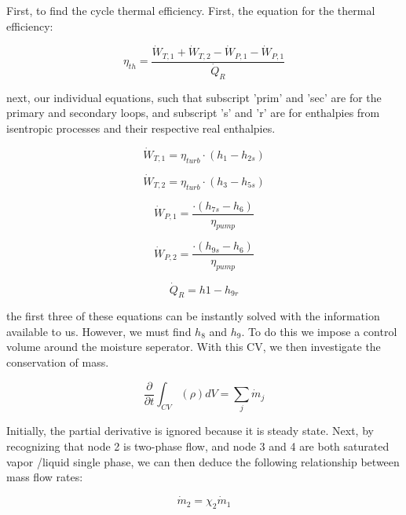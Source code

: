 \documentclass{article}
\begin{document}
First, to find the cycle thermal efficiency. First, the equation for the thermal efficiency:

\begin{equation}
    \eta_{th} = \frac{\Dot{W}_{T,1} + \Dot{W}_{T,2} - \Dot{W}_{P,1} - \Dot{W}_{P,1}}{\Dot{Q}_R}
\end{equation}

next, our individual equations, such that subscript 'prim' and 'sec' are for the primary and secondary loops, and subscript 's' and 'r' are for enthalpies from isentropic processes and their respective real enthalpies. 

\begin{equation}
    \Dot{W}_{T,1} = \eta_{turb} \cdot (h_1 - h_{2s}) 
\end{equation}

\begin{equation}
    \Dot{W}_{T,2} = \eta_{turb} \cdot (h_3 - h_{5s}) 
\end{equation}

\begin{equation}
    \Dot{W}_{P,1} = \frac{\cdot (h_{7s} - h_{6})}{\eta_{pump}} 
\end{equation}

\begin{equation}
    \Dot{W}_{P,2} = \frac{\cdot (h_{9s} - h_{6})}{\eta_{pump}} 
\end{equation}

\begin{equation}
    \Dot{Q}_{R} = h1 - h_{9r}
\end{equation}

the first three of these equations can be instantly solved with the information available to us. However, we must find $h_8$ and $h_9$. To do this we impose a control volume around the moisture seperator. With this CV, we then investigate the conservation of mass. 

\begin{equation}
    \frac{\partial}{\partial t} \int_{CV} (\rho) dV = \sum_j \Dot{m}_j
\end{equation}

Initially, the partial derivative is ignored because it is steady state. Next, by recognizing that node 2 is two-phase flow, and node 3 and 4 are both saturated vapor /liquid single phase, we can then deduce the following relationship between mass flow rates:

\begin{equation}
    \Dot{m}_2 = \chi_2 \Dot{m}_1
\end{equation}
\end{document}
